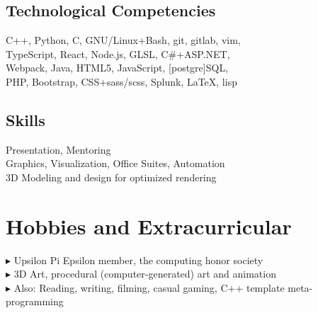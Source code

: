 \documentclass[Letterpaper,11pt]{article}
\newcommand{\bul}{$\blacktriangleright$ }
\begin{document}
\begin{multicols}{2}

    \subsection*{Technological Competencies}

        C++, Python, C, GNU/Linux+Bash, git, gitlab, vim, \\
        TypeScript, React, Node.js, GLSL, C\#+ASP.NET, \\
        Webpack, Java, HTML5, JavaScript, [postgre]SQL, \\ 
        PHP, Bootstrap, CSS+sass/scss, Splunk, \LaTeX, lisp \\

    \subsection*{Skills}

        Presentation, Mentoring\\
        Graphics, Visualization, Office Suites, Automation\\
        3D Modeling and design for optimized rendering

\end{multicols}

\section*{Hobbies and Extracurricular}

    \bul Upsilon Pi Epsilon member, the computing honor society\\
    \bul 3D Art, procedural (computer-generated) art and animation\\
    \bul Also: Reading, writing, filming, casual gaming, C++ template meta-programming

\clearpage
\end{document}
